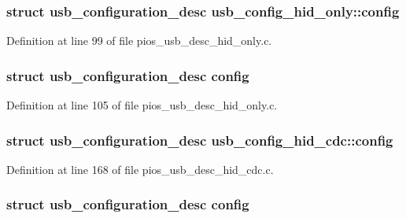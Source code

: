 \hypertarget{group___p_i_o_s___u_s_b___d_e_s_c_gae5e25501e424468c229df0d1e09423a8}{
\subsubsection[{config}]{\setlength{\rightskip}{0pt plus 5cm}struct {\bf usb\-\_\-configuration\-\_\-desc} usb\-\_\-config\-\_\-hid\-\_\-only\-::config}}\label{group___p_i_o_s___u_s_b___d_e_s_c_gae5e25501e424468c229df0d1e09423a8}


Definition at line 99 of file pios\-\_\-usb\-\_\-desc\-\_\-hid\-\_\-only.\-c.

\hypertarget{group___p_i_o_s___u_s_b___d_e_s_c_ga6517677dcb9452a3759e7ec7e360e690}{
\subsubsection[{config}]{\setlength{\rightskip}{0pt plus 5cm}struct {\bf usb\-\_\-configuration\-\_\-desc} config}}\label{group___p_i_o_s___u_s_b___d_e_s_c_ga6517677dcb9452a3759e7ec7e360e690}


Definition at line 105 of file pios\-\_\-usb\-\_\-desc\-\_\-hid\-\_\-only.\-c.

\hypertarget{group___p_i_o_s___u_s_b___d_e_s_c_ga41025645591a4ff38c6bfb3bf799cdf1}{
\subsubsection[{config}]{\setlength{\rightskip}{0pt plus 5cm}struct {\bf usb\-\_\-configuration\-\_\-desc} usb\-\_\-config\-\_\-hid\-\_\-cdc\-::config}}\label{group___p_i_o_s___u_s_b___d_e_s_c_ga41025645591a4ff38c6bfb3bf799cdf1}


Definition at line 168 of file pios\-\_\-usb\-\_\-desc\-\_\-hid\-\_\-cdc.\-c.

\hypertarget{group___p_i_o_s___u_s_b___d_e_s_c_ga6517677dcb9452a3759e7ec7e360e690}{
\subsubsection[{config}]{\setlength{\rightskip}{0pt plus 5cm}struct {\bf usb\-\_\-configuration\-\_\-desc} config}}\label{group___p_i_o_s___u_s_b___d_e_s_c_ga6517677dcb9452a3759e7ec7e360e690}


